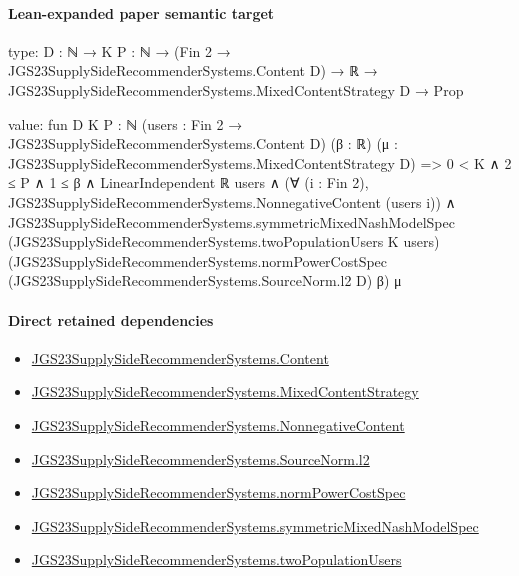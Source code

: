 \documentclass[10pt]{article}
\begin{document}
\paragraph{Lean-expanded paper semantic target}
\begin{ReviewVerbatim}
type:
{D : ℕ} →
  {K P : ℕ} →
    (Fin 2 → JGS23SupplySideRecommenderSystems.Content D) →
      ℝ → JGS23SupplySideRecommenderSystems.MixedContentStrategy D → Prop

value:
fun {D K P : ℕ} (users : Fin 2 → JGS23SupplySideRecommenderSystems.Content D) (β : ℝ)
    (μ : JGS23SupplySideRecommenderSystems.MixedContentStrategy D) =>
  0 < K ∧
    2 ≤ P ∧
      1 ≤ β ∧
        LinearIndependent ℝ users ∧
          (∀ (i : Fin 2), JGS23SupplySideRecommenderSystems.NonnegativeContent (users i)) ∧
            JGS23SupplySideRecommenderSystems.symmetricMixedNashModelSpec
              (JGS23SupplySideRecommenderSystems.twoPopulationUsers K users)
              (JGS23SupplySideRecommenderSystems.normPowerCostSpec (JGS23SupplySideRecommenderSystems.SourceNorm.l2 D)
                β)
              μ
\end{ReviewVerbatim}

\paragraph{Direct retained dependencies}
\begin{itemize}\raggedright
\item \hyperlink{governing-declaration-367305fda50f0ada}{JGS23\allowbreak{}Supply\allowbreak{}Side\allowbreak{}Recommender\allowbreak{}Systems.\allowbreak{}Content}
\item \hyperlink{governing-declaration-2089965d06cf0282}{JGS23\allowbreak{}Supply\allowbreak{}Side\allowbreak{}Recommender\allowbreak{}Systems.\allowbreak{}Mixed\allowbreak{}Content\allowbreak{}Strategy}
\item \hyperlink{governing-declaration-d426babe40b9593c}{JGS23\allowbreak{}Supply\allowbreak{}Side\allowbreak{}Recommender\allowbreak{}Systems.\allowbreak{}Nonnegative\allowbreak{}Content}
\item \hyperlink{governing-declaration-9299663ffe3ecb38}{JGS23\allowbreak{}Supply\allowbreak{}Side\allowbreak{}Recommender\allowbreak{}Systems.\allowbreak{}Source\allowbreak{}Norm.\allowbreak{}l2}
\item \hyperlink{governing-declaration-6ba13dc1cae95e6e}{JGS23\allowbreak{}Supply\allowbreak{}Side\allowbreak{}Recommender\allowbreak{}Systems.\allowbreak{}norm\allowbreak{}Power\allowbreak{}Cost\allowbreak{}Spec}
\item \hyperlink{paper-prerequisite-b412efba7deb757f}{JGS23\allowbreak{}Supply\allowbreak{}Side\allowbreak{}Recommender\allowbreak{}Systems.\allowbreak{}symmetric\allowbreak{}Mixed\allowbreak{}Nash\allowbreak{}Model\allowbreak{}Spec}
\item \hyperlink{governing-declaration-43b84bc2140424db}{JGS23\allowbreak{}Supply\allowbreak{}Side\allowbreak{}Recommender\allowbreak{}Systems.\allowbreak{}two\allowbreak{}Population\allowbreak{}Users}
\end{itemize}
\end{document}
